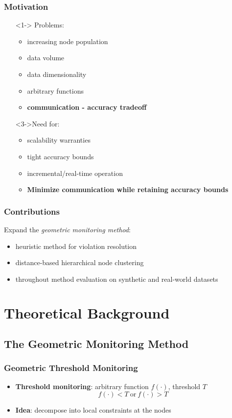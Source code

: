 \documentclass[hyperref={pdfpagelabels=false}]{beamer}
\begin{document}
\begin{frame} \frametitle{Motivation}
\begin{itemize}
\item[]<1-> Problems:
\begin{itemize}
	\item<1-> increasing node population
	\item<1-> data volume
	\item<1-> data dimensionality
	\item<1-> arbitrary functions
	\item<2-> \textbf{communication - accuracy tradeoff}
\end{itemize}
\item[]<3->Need for:
\begin{itemize}
	\item<3-> scalability warranties
	\item<3-> tight accuracy bounds
	\item<3-> incremental/real-time operation
	\item<4-> \textbf{Minimize communication while retaining accuracy bounds}
\end{itemize}
\end{itemize}
\end{frame}

\begin{frame} \frametitle{Contributions}
Expand the \emph{geometric monitoring method}:
\begin{itemize}
\item<1-> heuristic method for violation resolution
\item<2-> distance-based hierarchical node clustering%
\item<3-> throughout method evaluation on synthetic and real-world datasets
\end{itemize}
\end{frame}

\section{Theoretical Background}
\begin{frame}
  \tableofcontents[currentsection]
 \end{frame}
\subsection{The Geometric Monitoring Method}
\begin{frame} \frametitle{Geometric Threshold Monitoring}
\begin{itemize}
\item \textbf{Threshold monitoring}: arbitrary function $f(\cdot)$, threshold $T$\\
 $$f(\cdot)<T\ \text{or}\ f(\cdot)>T$$
\item \textbf{Idea}: decompose into local constraints at the nodes
\end{itemize}
\end{frame}
\end{document}
